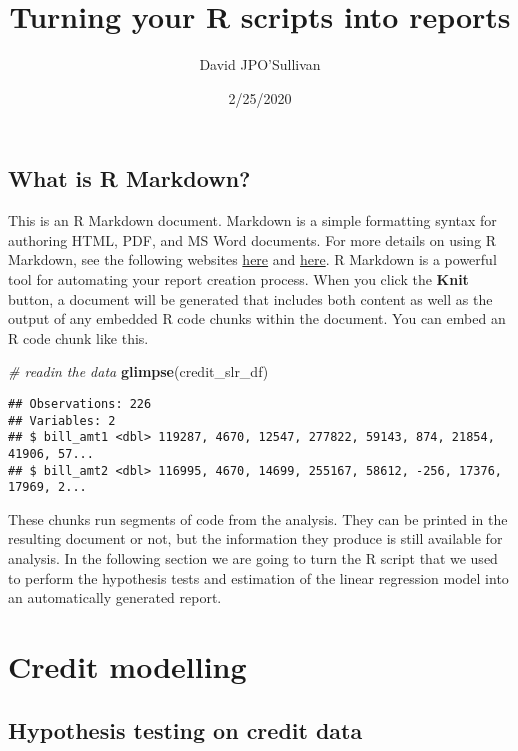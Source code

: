 \documentclass[
]{article}
\title{Turning your R scripts into reports}
\author{David JPO'Sullivan}
\date{2/25/2020}
\newenvironment{Shaded}{\begin{snugshade}}{\end{snugshade}}
\newcommand{\CommentTok}[1]{\textcolor[rgb]{0.56,0.35,0.01}{\textit{#1}}}
\newcommand{\KeywordTok}[1]{\textcolor[rgb]{0.13,0.29,0.53}{\textbf{#1}}}
\newcommand{\NormalTok}[1]{#1}
\begin{document}
\maketitle

\hypertarget{what-is-r-markdown}{%
\subsection{What is R Markdown?}\label{what-is-r-markdown}}

This is an R Markdown document. Markdown is a simple formatting syntax
for authoring HTML, PDF, and MS Word documents. For more details on
using R Markdown, see the following websites
\href{http://rmarkdown.rstudio.com}{here} and
\href{https://rmarkdown.rstudio.com/articles_intro.html}{here}. R
Markdown is a powerful tool for automating your report creation process.
When you click the \textbf{Knit} button, a document will be generated
that includes both content as well as the output of any embedded R code
chunks within the document. You can embed an R code chunk like this.

\begin{Shaded}
\begin{Highlighting}[]
\CommentTok{# readin the data}
\KeywordTok{glimpse}\NormalTok{(credit_slr_df)}
\end{Highlighting}
\end{Shaded}

\begin{verbatim}
## Observations: 226
## Variables: 2
## $ bill_amt1 <dbl> 119287, 4670, 12547, 277822, 59143, 874, 21854, 41906, 57...
## $ bill_amt2 <dbl> 116995, 4670, 14699, 255167, 58612, -256, 17376, 17969, 2...
\end{verbatim}

These chunks run segments of code from the analysis. They can be printed
in the resulting document or not, but the information they produce is
still available for analysis. In the following section we are going to
turn the R script that we used to perform the hypothesis tests and
estimation of the linear regression model into an automatically
generated report.

\newpage

\hypertarget{credit-modelling}{%
\section{Credit modelling}\label{credit-modelling}}

\hypertarget{hypothesis-testing-on-credit-data}{%
\subsection{Hypothesis testing on credit
data}\label{hypothesis-testing-on-credit-data}}
\end{document}
